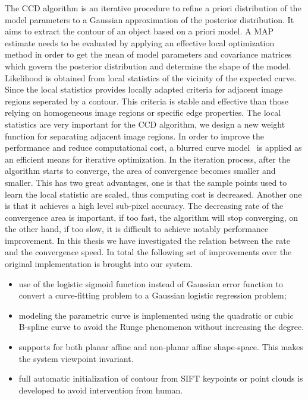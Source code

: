 The CCD algorithm is an iterative procedure to refine a priori distribution of the model parameters to a Gaussian
approximation of the posterior distribution. It aims to extract the
contour of an object based on a priori model. A MAP estimate needs to be
evaluated by applying an effective local optimization method in order to get
the mean of model parameters and covariance matrices which govern the
posterior distribution and determine the shape of the model. Likelihood is 
obtained from local statistics of the vicinity of the expected
curve. Since the local statistics provides locally adapted criteria for
adjacent image regions seperated by a contour. This criteria is stable
and effective than those relying on homogeneous image regions or
specific edge properties. The local statistics are very
important for the CCD algorithm, we design a new weight
function for separating adjacent image regions. 
 In order to improve the performance and
reduce computational cost, a blurred curve model~\cite{hanek2004contracting} is applied as an efficient means for
iterative optimization. In the iteration process, after the
algorithm starts to converge, the area of
convergence becomes smaller and smaller. This has two great
advantages, one is that the sample points used to learn the local statistic
are scaled, thus computing cost is decreased. Another one is that it
achieves a high level sub-pixel accuracy. The decreasing rate of the
convergence area is important, if too fast, the algorithm will stop
converging, on the other hand, if too slow, it is difficult to achieve
notably performance improvement. In this thesis we have investigated the relation between
the rate and the convergence speed. In total the following set of
improvements over the original implementation is brought into our system.
\begin{itemize}
\item use of the logistic sigmoid function instead of Gaussian error
  function to convert a curve-fitting problem to a Gaussian logistic
  regression problem;
\item modeling the parametric curve is implemented using the quadratic or
cubic B-spline curve  to avoid the Runge phenomenon without increasing
the degree.
\item supports for both planar affine and non-planar affine
  shape-space. This makes the system viewpoint invariant.
\item full automatic initialization of contour from SIFT keypoints or
  point clouds is developed to avoid
  intervention from human.
\end{itemize}

